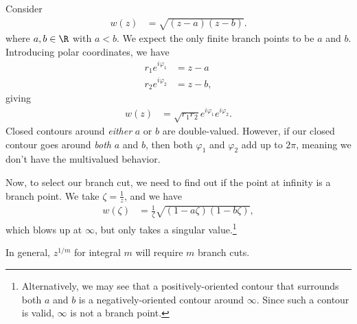 \documentclass[10pt]{mypackage}
\begin{document}
\begin{example}
  Consider
  \begin{align*}
    w(z) &= \sqrt{\left( z-a \right)\left( z-b \right)}.
  \end{align*}
  where $a,b\in\R$ with $a < b$. We expect the only finite branch points to be $a$ and $b$. Introducing polar coordinates, we have
  \begin{align*}
    r_1e^{i\varphi_1} &= z-a\\
    r_2e^{i\varphi_2} &= z-b,
  \end{align*}
  giving
  \begin{align*}
    w(z) &= \sqrt{r_1r_2}e^{i\varphi_1}e^{i\varphi_2}.
  \end{align*}
  Closed contours around \textit{either} $a$ or $b$ are double-valued. However, if our closed contour goes around \textit{both} $a$ and $b$, then both $\varphi_1$ and $\varphi_2$ add up to $2\pi$, meaning we don't have the multivalued behavior.\newline

  Now, to select our branch cut, we need to find out if the point at infinity is a branch point. We take $\zeta = \frac{1}{z}$, and we have
  \begin{align*}
    w(\zeta) &= \frac{1}{\zeta} \sqrt{\left( 1-a\zeta \right)\left( 1-b\zeta \right)},
  \end{align*}
  which blows up at $\infty$, but only takes a singular value.\footnote{Alternatively, we may see that a positively-oriented contour that surrounds both $a$ and $b$ is a negatively-oriented contour around $\infty$. Since such a contour is valid, $\infty$ is not a branch point.}
\end{example}
In general, $z^{1/m}$ for integral $m$ will require $m$ branch cuts.
\end{document}
